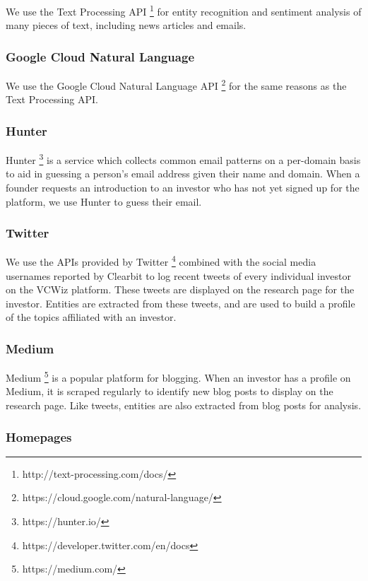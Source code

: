 We use the Text Processing API \footnote{http://text-processing.com/docs/} for entity recognition and sentiment analysis of many pieces of text, including news articles and emails.

\subsubsection{Google Cloud Natural Language}

We use the Google Cloud Natural Language API \footnote{https://cloud.google.com/natural-language/} for the same reasons as the Text Processing API.

\subsubsection{Hunter}

Hunter \footnote{https://hunter.io/} is a service which collects common email patterns on a per-domain basis to aid in guessing a person's email address given their name and domain. When a founder requests an introduction to an investor who has not yet signed up for the platform, we use Hunter to guess their email.

\subsubsection{Twitter}

We use the APIs provided by Twitter \footnote{https://developer.twitter.com/en/docs} combined with the social media usernames reported by Clearbit to log recent tweets of every individual investor on the VCWiz platform. These tweets are displayed on the research page for the investor. Entities are extracted from these tweets, and are used to build a profile of the topics affiliated with an investor.

\subsubsection{Medium}

Medium \footnote{https://medium.com/} is a popular platform for blogging. When an investor has a profile on Medium, it is scraped regularly to identify new blog posts to display on the research page. Like tweets, entities are also extracted from blog posts for analysis.

\subsubsection{Homepages}


